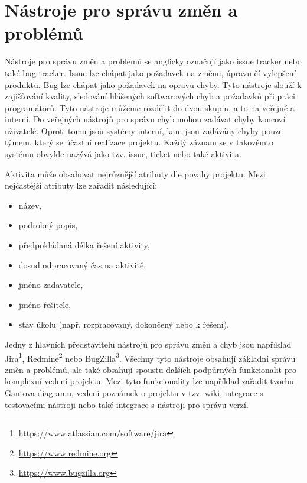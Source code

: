 \documentclass[czech,DP]{thesiskiv}
\begin{document}
\section{Nástroje pro správu změn a problémů}\label{sec:bugtracker}
Nástroje pro správu změn a problémů se anglicky označují jako issue tracker nebo také bug tracker. Issue lze chápat jako požadavek na změnu, úpravu čí vylepšení produktu. Bug lze chápat jako požadavek na opravu chyby. Tyto nástroje slouží k zajišťování kvality, sledování hlášených softwarových chyb a požadavků při práci programátorů. Tyto nástroje můžeme rozdělit do dvou skupin, a to na veřejné a interní. Do veřejných nástrojů pro správu chyb mohou zadávat chyby koncoví uživatelé. Oproti tomu jsou systémy interní, kam jsou zadávány chyby pouze týmem, který se účastní realizace projektu. Každý záznam se v takovémto systému obvykle nazývá jako tzv. issue, ticket nebo také aktivita.
\par
Aktivita může obsahovat nejrůznější atributy dle povahy projektu. Mezi nejčastější atributy lze zařadit následující:
\begin{itemize}
    \item název,
    \item podrobný popis,
    \item předpokládaná délka řešení aktivity,
    \item dosud odpracovaný čas na aktivitě,
    \item jméno zadavatele,
    \item jméno řešitele,
    \item stav úkolu (např. rozpracovaný, dokončený nebo k řešení).
\end{itemize}
\par
Jedny z hlavních představitelů nástrojů pro správu změn a chyb jsou například Jira\footnote{\url{https://www.atlassian.com/software/jira}}, Redmine\footnote{\url{https://www.redmine.org}} nebo BugZilla\footnote{\url{https://www.bugzilla.org}}. Všechny tyto nástroje obsahují základní správu změn a problémů, ale také obsahují spoustu dalších podpůrných funkcionalit pro komplexní vedení projektu. Mezi tyto funkcionality lze například zařadit tvorbu Gantova diagramu, vedení poznámek o projektu v tzv. wiki, integrace s testovacími nástroji nebo také integrace s nástroji pro správu verzí.
\end{document}
